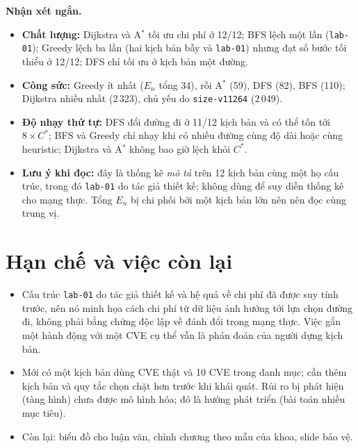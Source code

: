 \documentclass[11pt,a4paper]{article}
\newcommand{\Cs}{C^{*}}
\begin{document}
\textbf{Nhận xét ngắn.}
\begin{itemize}
  \item \textbf{Chất lượng:} Dijkstra và A$^{*}$ tối ưu chi phí ở 12/12; BFS lệch một lần (\texttt{lab-01}); Greedy lệch ba lần (hai kịch bản bẫy và \texttt{lab-01}) nhưng đạt số bước tối thiểu ở 12/12; DFS chỉ tối ưu ở kịch bản một đường.
  \item \textbf{Công sức:} Greedy ít nhất ($E_n$ tổng 34), rồi A$^{*}$ (59), DFS (82), BFS (110); Dijkstra nhiều nhất (2\,323), chủ yếu do \texttt{size-v11264} (2\,049).
  \item \textbf{Độ nhạy thứ tự:} DFS đổi đường đi ở 11/12 kịch bản và có thể tốn tới $8\times\Cs$; BFS và Greedy chỉ nhạy khi có nhiều đường cùng độ dài hoặc cùng heuristic; Dijkstra và A$^{*}$ không bao giờ lệch khỏi $\Cs$.
  \item \textbf{Lưu ý khi đọc:} đây là thống kê \emph{mô tả} trên 12 kịch bản cùng một họ cấu trúc, trong đó \texttt{lab-01} do tác giả thiết kế; không dùng để suy diễn thống kê cho mạng thực. Tổng $E_n$ bị chi phối bởi một kịch bản lớn nên nên đọc cùng trung vị.
\end{itemize}

\section{Hạn chế và việc còn lại}

\begin{itemize}
  \item Cấu trúc \texttt{lab-01} do tác giả thiết kế và hệ quả về chi phí đã được suy tính trước, nên nó minh họa cách chi phí từ dữ liệu ảnh hưởng tới lựa chọn đường đi, không phải bằng chứng độc lập về đánh đổi trong mạng thực. Việc gắn một hành động với một CVE cụ thể vẫn là phán đoán của người dựng kịch bản.
  \item Mới có một kịch bản dùng CVE thật và 10 CVE trong danh mục; cần thêm kịch bản và quy tắc chọn chặt hơn trước khi khái quát. Rủi ro bị phát hiện (tàng hình) chưa được mô hình hóa; đó là hướng phát triển (bài toán nhiều mục tiêu).
  \item Còn lại: biểu đồ cho luận văn, chỉnh chương theo mẫu của khoa, slide bảo vệ.
\end{itemize}
\end{document}
